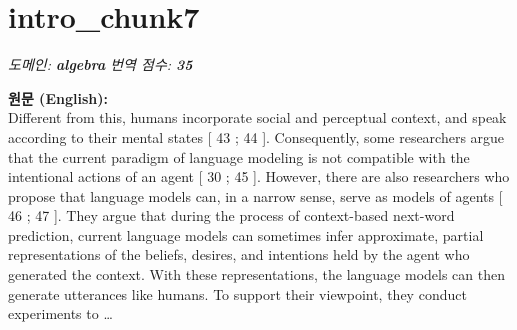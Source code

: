 \documentclass[12pt,a4paper]{article}
\begin{document}
\section{intro\_chunk7}
\noindent\textit{\small 도메인: \textbf{algebra} \quad 번역 점수: \textbf{\color{red!70!black}35}}
\vspace{0.5em}

\begin{mdframed}[style=orig]
\noindent\textbf{\small 원문 (English):}\\[2pt]
\small Different from this, humans incorporate social and perceptual context, and speak according to their mental states [ 43 ; 44 ]. Consequently, some researchers argue that the current paradigm of language modeling is not compatible with the intentional actions of an agent [ 30 ; 45 ]. However, there are also researchers who propose that language models can, in a narrow sense, serve as models of agents [ 46 ; 47 ]. They argue that during the process of context-based next-word prediction, current language models can sometimes infer approximate, partial representations of the beliefs, desires, and intentions held by the agent who generated the context. With these representations, the language models can then generate utterances like humans. To support their viewpoint, they conduct experiments to \ldots
\end{mdframed}
\vspace{0.4em}
\end{document}
